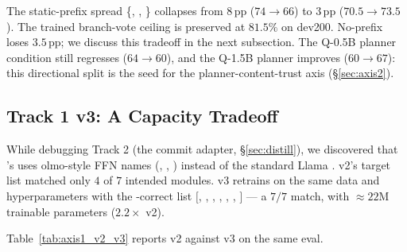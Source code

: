 The static-prefix spread \{\ctwo{}, , \}
collapses from $8$\,pp ($74 \to 66$) to $3$\,pp ($70.5 \to 73.5$).
The trained \cmaj{} branch-vote ceiling is preserved at $81.5\%$
on dev200.  No-prefix \ctwo{} loses $3.5$\,pp; we discuss this
tradeoff in the next subsection.  The Q-0.5B planner condition
still regresses ($64 \to 60$), and the Q-1.5B planner improves
($60 \to 67$): this directional split is the seed for the
planner-content-trust axis (\S\ref{sec:axis2}).

\subsection{Track 1 v3: A Capacity Tradeoff}
\label{subsec:axis1_v3}

While debugging Track 2 (the commit adapter,
\S\ref{sec:distill}), we discovered that \LLaDA{}'s
 uses olmo-style FFN names
(, , ) instead of the
standard Llama .  v2's
target list matched only $4$ of $7$ intended modules.  v3 retrains
on the same data and hyperparameters with the \LLaDA{}-correct list
$[$, , , ,
, , $]$ --- a $7/7$
match, with $\approx 22$M trainable parameters ($2.2\times$ v2).

Table~\ref{tab:axis1_v2_v3} reports v2 against v3 on the same eval.

